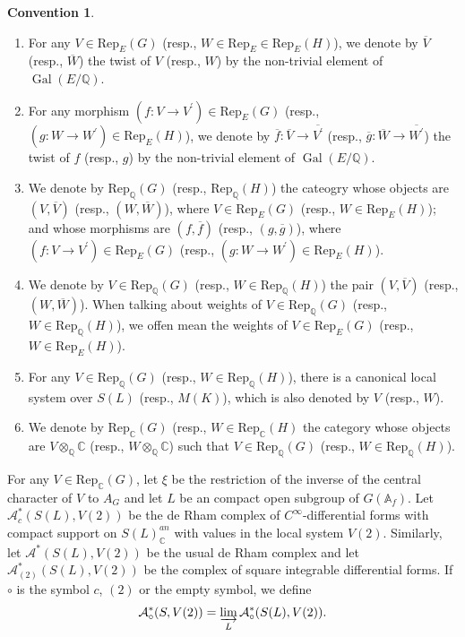 \documentclass[11pt, a4paper]{amsart}
\theoremstyle{plain}
\theoremstyle{definition}
\newtheorem{convention}[theorem]{Convention}
\numberwithin{equation}{section}
\def\AAA{\mathbb{A}}
\def\CC{\mathbb{C}}
\def\QQ{\mathbb{Q}}
\DeclareMathOperator{\Gal}{Gal}
\begin{document}
\begin{convention}
\label{convention: V^{Q} and W_{Q}}
    \begin{enumerate}
        \item For any $V \in \mathrm{Rep}_{E}(G)$ (resp., $W \in \mathrm{Rep}_{E} \in \mathrm{Rep}_{E}(H)$), we denote by $\overline{V}$ (resp., $\overline{W}$) the twist of $V$ (resp., $W$) by the non-trivial element of $\Gal(E/\QQ)$. 
        \item For any morphism $(f\colon V \rightarrow V^{\prime})\in \mathrm{Rep}_{E}(G)$ (resp., $(g\colon W \rightarrow W^{\prime}) \in \mathrm{Rep}_{E}(H)$), we denote by $\overline{f}\colon \overline{V} \rightarrow \overline{V^{\prime}}$ (resp., $\overline{g}\colon \overline{W} \rightarrow \overline{W^{\prime}}$) the twist of $f$ (resp., $g$) by the non-trivial element of $\Gal(E/\QQ)$. 
        \item We denote by $\mathrm{Rep}_{\QQ}(G)$ (resp., $\mathrm{Rep}_{\QQ}(H)$) the cateogry whose objects are $(V, \overline{V})$ (resp., $(W, \overline{W})$), where $V \in \mathrm{Rep}_{E}(G)$ (resp., $W \in \mathrm{Rep}_{E}(H)$); and whose morphisms are $(f, \overline{f})$ (resp., $(g, \overline{g})$), where $(f: V \rightarrow V^{\prime}) \in \mathrm{Rep}_{E}(G)$ (resp., $(g: W \rightarrow W^{\prime}) \in \mathrm{Rep}_{E}(H)$). 
        \item We denote by $V \in \mathrm{Rep}_{\QQ}(G)$ (resp., $W \in \mathrm{Rep}_{\QQ}(H)$) the pair $(V, \overline{V})$ (resp., $(W, \overline{W})$). When talking about weights of $V \in \mathrm{Rep}_{\QQ}(G)$ (resp., $W \in \mathrm{Rep}_{\QQ}(H)$), we offen mean the weights of $V \in \mathrm{Rep}_{E}(G)$ (resp., $W \in \mathrm{Rep}_{E}(H)$). 
        \item For any $V \in \mathrm{Rep}_{\QQ}(G)$ (resp., $W \in \mathrm{Rep}_{\QQ}(H)$), there is a canonical local system over $S(L)$ (resp., $M(K)$), which is also denoted by $V$ (resp., $W$). 
        \item We denote by $\mathrm{Rep}_{\CC}(G)$ (resp., $W \in \mathrm{Rep}_{\CC}(H)$ the category whose objects are $V \otimes_{\QQ} \CC$ (resp., $W \otimes_{\QQ} \CC$) such that $V \in \mathrm{Rep}_{\QQ}(G)$ (resp., $W \in \mathrm{Rep}_{\QQ}(H)$). 
    \end{enumerate}
\end{convention}

For any $V \in \mathrm{Rep}_{\CC}(G)$, let $\xi$ be the restriction of the inverse of the central character of $V$ to $A_{G}$ and let $L$ be an compact open subgroup of $G(\AAA_{f})$. Let $\mathcal{A}^{*}_{c}(S(L), V(2))$ be the de Rham complex of $C^{\infty}$-differential forms with compact support on $S(L)_{\CC}^{an}$ with values in the local system $V(2)$. Similarly, let $\mathcal{A}^{*}(S(L), V(2))$ be the usual de Rham complex and let $\mathcal{A}^{*}_{(2)}(S(L), V(2))$ be the complex of square integrable differential forms. If $\circ$ is the symbol $c$, $(2)$ or the empty symbol, we define 
\begin{equation*}
    \mathcal{A}^{*}_{\circ}(S, V(2)) = \varinjlim_{L} \mathcal{A}^{*}_{\circ}(S(L), V(2)). 
\end{equation*}
\end{document}

